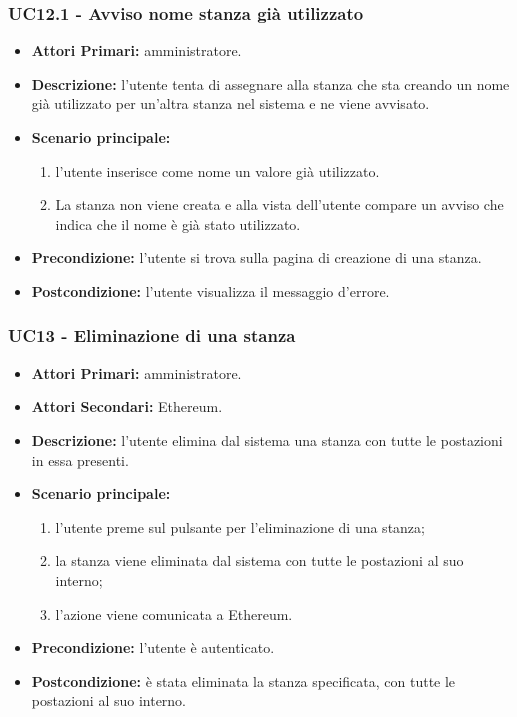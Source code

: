 \subsubsection{ UC12.1 - Avviso nome stanza già utilizzato}
\begin{itemize}
	\item\textbf{Attori Primari:}
	amministratore.
	\item\textbf{Descrizione:}
	l'utente tenta di assegnare alla stanza che sta creando un nome già utilizzato per un'altra stanza nel sistema e ne viene avvisato.
	\item\textbf{Scenario principale:}
	\begin{enumerate}
		\item l'utente inserisce come nome un valore già utilizzato.
		\item La stanza non viene creata e alla vista dell'utente compare un avviso che indica che il nome è già stato utilizzato. 
	\end{enumerate}
	\item\textbf{Precondizione:}
	l'utente si trova sulla pagina di creazione di una stanza.
	\item\textbf{Postcondizione:}
	l'utente visualizza il messaggio d'errore.
\end{itemize}

\subsubsection{ UC13 - Eliminazione di una stanza}
\begin{itemize}
	\item\textbf{Attori Primari:}
	amministratore.
	\item\textbf{Attori Secondari:}
	Ethereum.
	\item\textbf{Descrizione:} 
	l'utente elimina dal sistema una stanza con tutte le postazioni in essa presenti.
	\item\textbf{Scenario principale:} 
	\begin{enumerate}
		\item l'utente preme sul pulsante per l'eliminazione di una stanza;
		\item la stanza viene eliminata dal sistema con tutte le postazioni al suo interno;
		\item l'azione viene comunicata a Ethereum.
	\end{enumerate}
	\item\textbf{Precondizione:} 
	l'utente è autenticato.
	\item\textbf{Postcondizione:}
	è stata eliminata la stanza specificata, con tutte le postazioni al suo interno.
\end{itemize}


